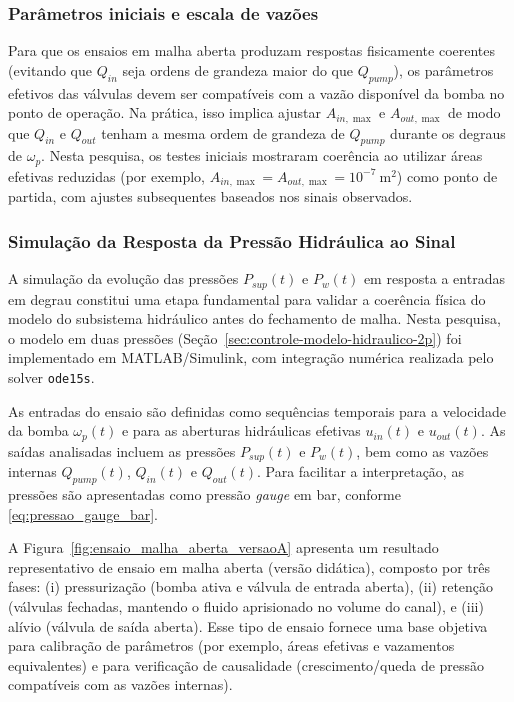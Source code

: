 \subsubsection{Parâmetros iniciais e escala de vazões}
\label{sec:controle-parametros-iniciais-ensaio}

Para que os ensaios em malha aberta produzam respostas fisicamente coerentes (evitando que $Q_{in}$ seja ordens de grandeza maior do que $Q_{pump}$), os parâmetros efetivos das válvulas devem ser compatíveis com a vazão disponível da bomba no ponto de operação. Na prática, isso implica ajustar $A_{in,\max}$ e $A_{out,\max}$ de modo que $Q_{in}$ e $Q_{out}$ tenham a mesma ordem de grandeza de $Q_{pump}$ durante os degraus de $\omega_p$. Nesta pesquisa, os testes iniciais mostraram coerência ao utilizar áreas efetivas reduzidas (por exemplo, $A_{in,\max}=A_{out,\max}=10^{-7}\ \text{m}^2$) como ponto de partida, com ajustes subsequentes baseados nos sinais observados.


\subsubsection{Simulação da Resposta da Pressão Hidráulica ao Sinal}
\label{sec:controle-4-1-4-1}

A simulação da evolução das pressões $P_{sup}(t)$ e $P_w(t)$ em resposta a entradas em degrau constitui uma etapa fundamental para validar a coerência física do modelo do subsistema hidráulico antes do fechamento de malha. Nesta pesquisa, o modelo em duas pressões (Seção~\ref{sec:controle-modelo-hidraulico-2p}) foi implementado em MATLAB/Simulink, com integração numérica realizada pelo solver \texttt{ode15s}.

As entradas do ensaio são definidas como sequências temporais para a velocidade da bomba $\omega_p(t)$ e para as aberturas hidráulicas efetivas $u_{in}(t)$ e $u_{out}(t)$. As saídas analisadas incluem as pressões $P_{sup}(t)$ e $P_w(t)$, bem como as vazões internas $Q_{pump}(t)$, $Q_{in}(t)$ e $Q_{out}(t)$. Para facilitar a interpretação, as pressões são apresentadas como pressão \textit{gauge} em bar, conforme \eqref{eq:pressao_gauge_bar}.

A Figura~\ref{fig:ensaio_malha_aberta_versaoA} apresenta um resultado representativo de ensaio em malha aberta (versão didática), composto por três fases: (i) pressurização (bomba ativa e válvula de entrada aberta), (ii) retenção (válvulas fechadas, mantendo o fluido aprisionado no volume do canal), e (iii) alívio (válvula de saída aberta). Esse tipo de ensaio fornece uma base objetiva para calibração de parâmetros (por exemplo, áreas efetivas e vazamentos equivalentes) e para verificação de causalidade (crescimento/queda de pressão compatíveis com as vazões internas).

